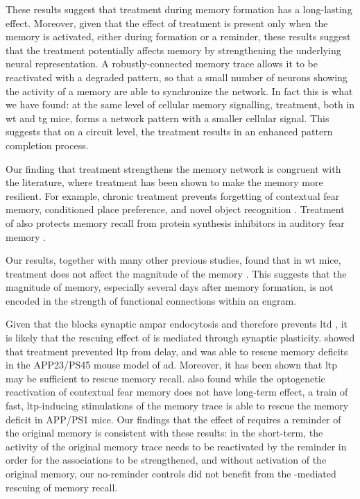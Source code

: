 These results suggest that \tglu{} treatment during memory formation has a long-lasting effect. Moreover, given that the effect of \tglu{} treatment is present only when the memory is activated, either during formation or a reminder, these results suggest that the \tglu{} treatment potentially affects memory by strengthening the underlying neural representation. A robustly-connected memory trace allows it to be reactivated with a degraded pattern, so that a small number of neurons showing the activity of a memory are able to synchronize the network. In fact this is what we have found: at the same level of cellular memory signalling, \tglu{} treatment, both in \gls{wt} and \gls{tg} mice, forms a network pattern with a smaller cellular signal. This suggests that on a circuit level, the \tglu{} treatment results in an enhanced pattern completion process.

Our finding that \tglu{} treatment strengthens the memory network is congruent with the literature, where \tglu{} treatment has been shown to make the memory more resilient. For example, chronic \tglu{} treatment prevents forgetting of contextual fear memory, conditioned place preference, and novel object recognition \citep{dong15, migues16}. Treatment of \tglu{} also protects memory recall from protein synthesis inhibitors in auditory fear memory \citep{lopez15}. 

Our results, together with many other previous studies, found that in \gls{wt} mice, \tglu{} treatment does not affect the magnitude of the memory \citep{dias12, dong15, migues16}.  This suggests that the magnitude of memory, especially several days after memory formation, is not encoded in the strength of functional connections within an engram.

Given that the \tglu{} blocks synaptic \gls{ampar} endocytosis and therefore prevents \gls{ltd} \citep{ahmadian04}, it is likely that the rescuing effect of \tglu{} is mediated through synaptic plasticity. \citet{dong15} showed that \tglu{} treatment prevented \gls{ltp} from delay, and was able to rescue memory deficits in the APP23/PS45 mouse model of \gls{ad}. Moreover, it has been shown that \gls{ltp} may be sufficient to rescue memory recall. \citet{roy16} also found while the optogenetic reactivation of contextual fear memory does not have long-term effect, a train of fast, \gls{ltp}-inducing stimulations of the memory trace is able to rescue the memory deficit in APP/PS1 mice. Our findings that the effect of \tglu{} requires a reminder of the original memory is consistent with these results: in the short-term, the activity of the original memory trace needs to be reactivated by the reminder in order for the associations to be strengthened, and without activation of the original memory, our no-reminder controls did not benefit from the \tglu{}-mediated rescuing of memory recall.


